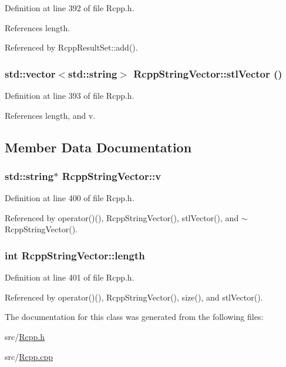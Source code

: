 Definition at line 392 of file Rcpp.h.

References length.

Referenced by RcppResultSet::add().\hypertarget{classRcppStringVector_2bd817c9332e1446ddf034938b256cc3}{
\subsubsection[stlVector]{\setlength{\rightskip}{0pt plus 5cm}std::vector$<$std::string$>$ RcppStringVector::stlVector ()}}
\label{classRcppStringVector_2bd817c9332e1446ddf034938b256cc3}




Definition at line 393 of file Rcpp.h.

References length, and v.

\subsection{Member Data Documentation}
\hypertarget{classRcppStringVector_94d14fa5093cc8219cbcb91aadfed09e}{
\subsubsection[v]{\setlength{\rightskip}{0pt plus 5cm}std::string$\ast$ {\bf RcppStringVector::v}}}
\label{classRcppStringVector_94d14fa5093cc8219cbcb91aadfed09e}




Definition at line 400 of file Rcpp.h.

Referenced by operator()(), RcppStringVector(), stlVector(), and $\sim$RcppStringVector().\hypertarget{classRcppStringVector_aa2e2e4335d14e46fc96b07836e99573}{
\subsubsection[length]{\setlength{\rightskip}{0pt plus 5cm}int {\bf RcppStringVector::length}}}
\label{classRcppStringVector_aa2e2e4335d14e46fc96b07836e99573}




Definition at line 401 of file Rcpp.h.

Referenced by operator()(), RcppStringVector(), size(), and stlVector().

The documentation for this class was generated from the following files:\begin{CompactItemize}
\item 
src/\hyperlink{Rcpp_8h}{Rcpp.h}\item 
src/\hyperlink{Rcpp_8cpp}{Rcpp.cpp}\end{CompactItemize}
